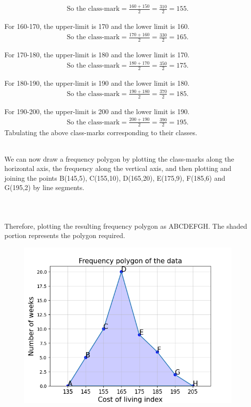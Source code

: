 \documentclass[journal,12pt,twocolumn]{IEEEtran}
\begin{document}
	\begin{align*}
	\text{So the class-mark}=\frac{160+150}{2}=\frac{310}{2}=155.
	\end{align*}
	\item For 160-170, the upper-limit is 170 and the lower limit is 160.
	\begin{align*}
	\text{So the class-mark}=\frac{170+160}{2}=\frac{330}{2}=165.
	\end{align*}
	\item For 170-180, the upper-limit is 180 and the lower limit is 170.
	\begin{align*}
	\text{So the class-mark}=\frac{180+170}{2}=\frac{350}{2}=175.
	\end{align*}
	\item For 180-190, the upper-limit is 190 and the lower limit is 180.
	\begin{align*}
	\text{So the class-mark}=\frac{190+180}{2}=\frac{370}{2}=185.
	\end{align*}
	\item For 190-200, the upper-limit is 200 and the lower limit is 190.
	\begin{align*}
	\text{So the class-mark}=\frac{200+190}{2}=\frac{390}{2}=195.
	\end{align*}
	Tabulating the above class-marks corresponding to their classes.
	\begin{table}[!htb]

\end{table}\\
We can now draw a frequency polygon by plotting the class-marks along the horizontal axis, the frequency along the vertical axis, and then plotting and joining the points B(145,5), C(155,10), D(165,20), E(175,9), F(185,6) and G(195,2) by line segments.\\
\\
\\
\\
Therefore, plotting the resulting frequency polygon as ABCDEFGH. The shaded portion represents the polygon required.
\begin{figure}[htb] 
		\centering
		\includegraphics[width=\columnwidth]{Fig_2}
	\end{figure}
\end{document}
